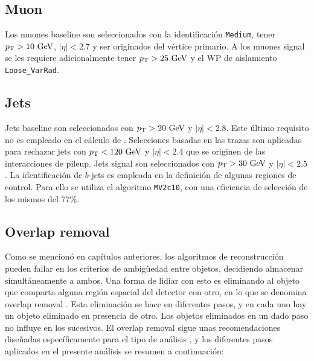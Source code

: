 \subsection{Muon}

Los muones baseline son seleccionados con la identificación \texttt{Medium}, tener $\pt>10\ \gev$, $|\eta|<2.7$ y ser originados del vértice primario. A los muones signal se les requiere adicionalmente tener $\pt>25\ \gev$ y el WP de aislamiento \texttt{Loose\_VarRad}.


\subsection{Jets}

Jets baseline son seleccionados con $p_{\text{T}}>20\ \text{GeV}$ y $|\eta|<2.8$. Este último requisito no es empleado en el cálculo de \met. Selecciones basadas en las trazas son aplicadas para rechazar jets con $p_{\text{T}}<120\ \text{GeV}$ y $|\eta|<2.4$ que se originen de las interacciones de pileup. Jets signal son seleccionados con $p_{\text{T}}>30\ \text{GeV}$ y $|\eta|<2.5$. La identificación de $b$-jets es empleada en la definición de algunas regiones de control. Para ello se utiliza el algoritmo \texttt{MV2c10}, con una eficiencia de selección de los mismos del 77\%.

\subsection{Overlap removal}

Como se mencionó en capítulos anteriores, los algoritmos de reconstrucción pueden fallar en los criterios de ambigüedad entre objetos, decidiendo almacenar simultáneamente a ambos. Una forma de lidiar con esto es eliminando al objeto que comparta alguna región espacial del detector con otro, en lo que se denomina overlap removal \cite{Adams:1743654}. Esta eliminación se hace en diferentes pasos, y en cada uno hay un objeto eliminado en presencia de otro. Los objetos eliminados en un dado paso no influye en los sucesivos.
El overlap removal sigue unas recomendaciones diseñadas específicamente para el tipo de análisis \cite{ATL-COM-PHYS-2016-1518}, y los diferentes pasos aplicados en el presente análisis se resumen a continuación: 

